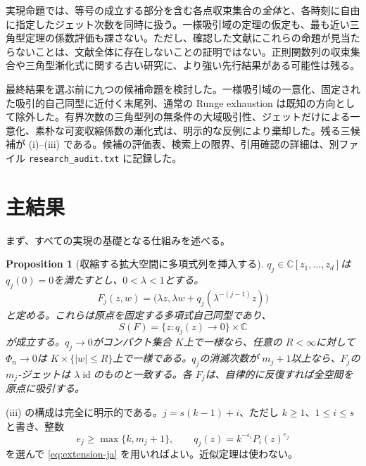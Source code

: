 \documentclass[12pt]{amsart}
\newtheorem{prop}[thm]{Proposition}
\theoremstyle{definition}
\theoremstyle{remark}
\numberwithin{equation}{section}
\DeclareMathOperator{\id}{id}
\newcommand{\C}{\mathbb{C}}
\begin{document}
実現命題では、等号の成立する部分を含む各点収束集合の\emph{全体}と、各時刻に自由に指定したジェット次数を同時に扱う。一様吸引域の定理の仮定も、最も近い三角型定理の係数評価も課さない。ただし、確認した文献にこれらの命題が見当たらないことは、文献全体に存在しないことの証明ではない。正則関数列の収束集合や三角型漸化式に関する古い研究に、より強い先行結果がある可能性は残る。

最終結果を選ぶ前に九つの候補命題を検討した。一様吸引域の一意化、固定された吸引的自己同型に近付く末尾列、通常の Runge exhaustion は既知の方向として除外した。有界次数の三角型列の無条件の大域吸引性、ジェットだけによる一意化、素朴な可変収縮係数の漸化式は、明示的な反例により棄却した。残る三候補が (i)--(iii) である。候補の評価表、検索上の限界、引用確認の詳細は、別ファイル \texttt{research\_audit.txt} に記録した。

\section{主結果}
まず、すべての実現の基礎となる仕組みを述べる。

\begin{prop}[収縮する拡大空間に多項式列を挿入する]\label{prop:transfer-ja}
\allowbreak$q_j\in\C[z_1,\ldots,z_d]$\allowbreak は \allowbreak$q_j(0)=0$\allowbreak を満たすとし、\allowbreak$0<\lambda<1$\allowbreak とする。
\begin{equation}\label{eq:extension-ja}
F_j(z,w)=\bigl(\lambda z,\lambda w+q_j(\lambda^{-(j-1)}z)\bigr)
\end{equation}
と定める。これらは原点を固定する多項式自己同型であり、
\begin{equation}\label{eq:transfer-ja}
S(F)=\{z:q_j(z)\longrightarrow0\}\times\C
\end{equation}
が成立する。\allowbreak$q_j\to0$\allowbreak がコンパクト集合 \allowbreak$K$\allowbreak 上で一様なら、任意の \allowbreak$R<\infty$\allowbreak に対して \allowbreak$\Phi_n\to0$\allowbreak は \allowbreak$K\times\{|w|\leq R\}$\allowbreak 上で一様である。\allowbreak$q_j$\allowbreak の消滅次数が \allowbreak$m_j+1$\allowbreak 以上なら、\allowbreak$F_j$\allowbreak の \allowbreak$m_j$\allowbreak-ジェットは \allowbreak$\lambda\id$\allowbreak のものと一致する。各 \allowbreak$F_j$\allowbreak は、自律的に反復すれば全空間を原点に吸引する。
\end{prop}

(iii) の構成は完全に明示的である。\allowbreak$j=s(k-1)+i$\allowbreak、ただし \allowbreak$k\geq1$\allowbreak、\allowbreak$1\leq i\leq s$\allowbreak と書き、整数
\begin{equation}\label{eq:exponents-ja}
e_j\geq\max\{k,m_j+1\},\qquad
q_j(z)=k^{-\epsilon_i}P_i(z)^{e_j}
\end{equation}
を選んで \eqref{eq:extension-ja} を用いればよい。近似定理は使わない。
\end{document}
